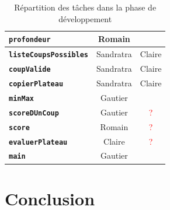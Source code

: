 \documentclass[11pt]{report}
\begin{document}
\begin{table}[h]
\begin{center}
\begin{tabular}{c|c|c|}
  \multicolumn{1}{|l|}{\textbf{\texttt{profondeur}}} & Romain & \cellcolor{lightgray} \\ \hline
  \multicolumn{1}{|l|}{\textbf{\texttt{listeCoupsPossibles}}} & Sandratra & Claire \\ \hline
 \multicolumn{1}{|l|}{ \textbf{\texttt{coupValide}}} & Sandratra & Claire\\ \hline
  \multicolumn{1}{|l|}{\textbf{\texttt{copierPlateau}}} & Sandratra & Claire \\ \hline
  \multicolumn{1}{|l|}{\textbf{\texttt{minMax}}} & Gautier & \cellcolor{lightgray} \\ \hline
  \multicolumn{1}{|l|}{\textbf{\texttt{scoreDUnCoup}}} & Gautier & \textcolor{red}{?} \\ \hline
  \multicolumn{1}{|l|}{\textbf{\texttt{score}}} & Romain & \textcolor{red}{?} \\ \hline
 \multicolumn{1}{|l|}{ \textbf{\texttt{evaluerPlateau}}} & Claire & \textcolor{red}{?}\\ \hline
 \multicolumn{1}{|l|}{ \textbf{\texttt{main}}} & Gautier & \cellcolor{lightgray} \\ \hline
\end{tabular}
\end{center}
\caption{Répartition des tâches dans la phase de développement}
\end{table}
\thispagestyle{plain}
\chapter*{Conclusion}
\end{document}
